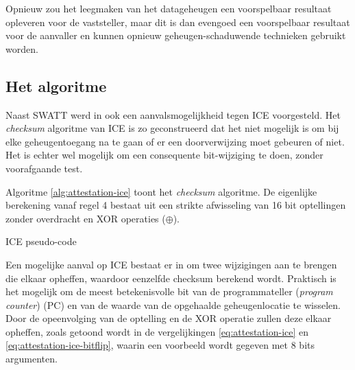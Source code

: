 Opnieuw zou het leegmaken van het datageheugen een voorspelbaar resultaat
opleveren voor de vaststeller, maar dit is dan evengoed een voorspelbaar
resultaat voor de aanvaller en kunnen opnieuw geheugen-schaduwende technieken
gebruikt worden.

\subsection{Het algoritme}

Naast SWATT werd in \citep{castelluccia2009difficulty} ook een
aanvalsmogelijkheid tegen ICE voorgesteld. Het \emph{checksum} algoritme van
ICE is zo geconstrueerd dat het niet mogelijk is om bij elke geheugentoegang na
te gaan of er een doorverwijzing moet gebeuren of niet. Het is echter wel
mogelijk om een consequente bit-wijziging te doen, zonder voorafgaande test.

Algoritme \ref{alg:attestation-ice} toont het \emph{checksum} algoritme. De
eigenlijke berekening vanaf regel 4 bestaat uit een strikte afwisseling van
16 bit optellingen zonder overdracht en XOR operaties ($\oplus$).

\begin{algorithm}
\begin{algorithmic}[1]
     
     
       
      
        
  \EndFor
\end{algorithmic}
\caption{ICE pseudo-code\label{alg:attestation-ice}}
\end{algorithm}

Een mogelijke aanval op ICE bestaat er in om twee wijzigingen aan te brengen
die elkaar opheffen, waardoor eenzelfde checksum berekend wordt. Praktisch is
het mogelijk om de meest betekenisvolle bit van de programmateller
(\emph{program counter}) (PC) en van de waarde van de opgehaalde
geheugenlocatie te wisselen. Door de opeenvolging van de optelling en de XOR
operatie zullen deze elkaar opheffen, zoals getoond wordt in de vergelijkingen
\ref{eq:attestation-ice} en \ref{eq:attestation-ice-bitflip}, waarin een
voorbeeld wordt gegeven met 8 bits argumenten.

